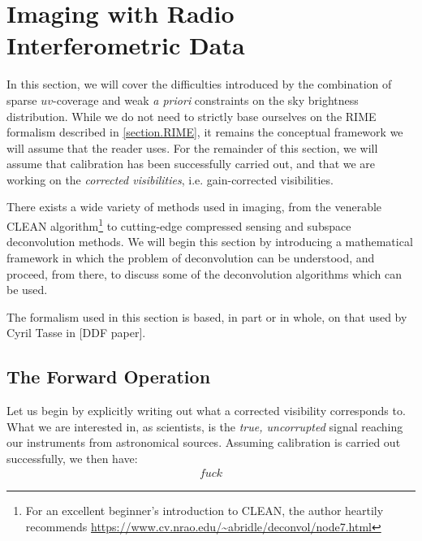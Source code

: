 
\section{Imaging with Radio Interferometric Data}\label{section.imaging}

\pg
In this section, we will cover the difficulties introduced by the combination of sparse $uv$-coverage and weak \emph{a priori} constraints on the sky brightness distribution. While we do not need to strictly base ourselves on the RIME formalism described in \cref{section.RIME}, it remains the conceptual framework we will assume that the reader uses. For the remainder of this section, we will assume that calibration has been successfully carried out, and that we are working on the \emph{corrected visibilities}, i.e. gain-corrected visibilities. 

\pg
There exists a wide variety of methods used in imaging, from the venerable CLEAN algorithm\footnote{For an excellent beginner's introduction to CLEAN, the author heartily recommends \url{https://www.cv.nrao.edu/~abridle/deconvol/node7.html}} to cutting-edge compressed sensing and subspace deconvolution methods. We will begin this section by introducing a mathematical framework in which the problem of deconvolution can be understood, and proceed, from there, to discuss some of the deconvolution algorithms which can be used.

\pg
The formalism used in this section is based, in part or in whole, on that used by Cyril Tasse in [DDF paper].

\subsection{The Forward Operation}

\pg
Let us begin by explicitly writing out what a corrected visibility corresponds to. What we are interested in, as scientists, is the \emph{true, uncorrupted} signal reaching our instruments from astronomical sources. Assuming calibration is carried out successfully, we then have:
\begin{align}
fuck
\end{align}